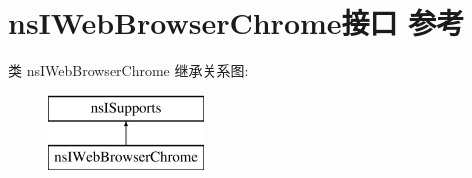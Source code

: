 \hypertarget{interfacens_i_web_browser_chrome}{}\section{ns\+I\+Web\+Browser\+Chrome接口 参考}
\label{interfacens_i_web_browser_chrome}
类 ns\+I\+Web\+Browser\+Chrome 继承关系图\+:\begin{figure}[H]
\begin{center}
\leavevmode
\includegraphics[height=2.000000cm]{interfacens_i_web_browser_chrome}
\end{center}
\end{figure}
